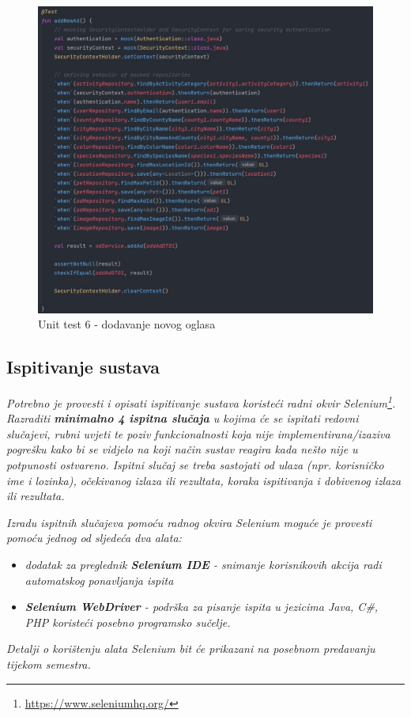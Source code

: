 \begin{figure}[H]
			\includegraphics[scale=0.5]{slike/unit6.PNG} 
			\centering
			\caption{Unit test 6 - dodavanje novog oglasa}
			\label{unit6}
		\end{figure}
		
\pagebreak	
			\subsection{Ispitivanje sustava}
			
			 \textit{Potrebno je provesti i opisati ispitivanje sustava koristeći radni okvir Selenium\footnote{\url{https://www.seleniumhq.org/}}. Razraditi \textbf{minimalno 4 ispitna slučaja} u kojima će se ispitati redovni slučajevi, rubni uvjeti te poziv funkcionalnosti koja nije implementirana/izaziva pogrešku kako bi se vidjelo na koji način sustav reagira kada nešto nije u potpunosti ostvareno. Ispitni slučaj se treba sastojati od ulaza (npr. korisničko ime i lozinka), očekivanog izlaza ili rezultata, koraka ispitivanja i dobivenog izlaza ili rezultata.\\ }
			 
			 \textit{Izradu ispitnih slučajeva pomoću radnog okvira Selenium moguće je provesti pomoću jednog od sljedeća dva alata:}
			 \begin{itemize}
			 	\item \textit{dodatak za preglednik \textbf{Selenium IDE} - snimanje korisnikovih akcija radi automatskog ponavljanja ispita	}
			 	\item \textit{\textbf{Selenium WebDriver} - podrška za pisanje ispita u jezicima Java, C\#, PHP koristeći posebno programsko sučelje.}
			 \end{itemize}
		 	\textit{Detalji o korištenju alata Selenium bit će prikazani na posebnom predavanju tijekom semestra.}
			
